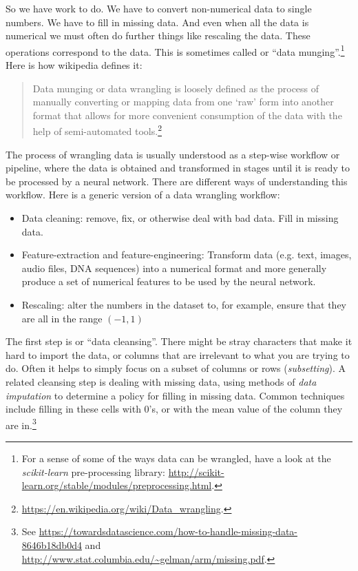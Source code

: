 So we have work to do. We have to convert non-numerical data to single numbers. We have to fill in missing data. And even when all the data is numerical we must often do further things like rescaling the data. These operations correspond to  the data. This is sometimes called  or ``data munging''.\footnote{For a sense of some of the ways data can be wrangled, have a look at the \emph{scikit-learn} pre-processing library: \url{http://scikit-learn.org/stable/modules/preprocessing.html}.}  Here is how wikipedia defines it:

\begin{quotation}
Data munging or data wrangling is loosely defined as the process of manually converting or mapping data from one `raw' form into another format that allows for more convenient consumption of the data with the help of semi-automated tools.\footnote{\url{https://en.wikipedia.org/wiki/Data_wrangling}.} 
\end{quotation}

The process of wrangling data is usually understood as a step-wise workflow or pipeline, where the data is obtained and transformed in stages until it is ready to be processed by a neural network. There are different ways  of understanding this workflow. Here is a generic version of a data wrangling workflow:
\begin{itemize}
\item Data cleaning: remove, fix, or otherwise deal with bad data. Fill in missing data.
\item Feature-extraction and feature-engineering: Transform data (e.g. text, images, audio files, DNA sequences) into a numerical format and more generally produce a set of numerical features to be used by the neural network.
\item Rescaling: alter the numbers in the dataset to, for example, ensure that they are all in the range $(-1,1)$
\end{itemize}

The first step is  or ``data cleansing''. There might be stray characters that make it hard to import the data, or columns that are irrelevant to what you are trying to do. Often it helps to simply focus on a subset of columns or rows (\emph{subsetting}). A related cleansing step is dealing with missing data, using methods of \emph{data imputation} to determine a policy for filling in missing data. Common techniques include filling in these cells  with 0's, or with the mean value of the column they are in.\footnote{See \url{https://towardsdatascience.com/how-to-handle-missing-data-8646b18db0d4} and \url{http://www.stat.columbia.edu/~gelman/arm/missing.pdf}.}

